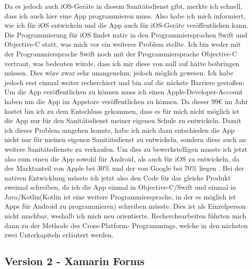     Da es jedoch auch iOS-Geräte in diesem Sanitätsdienst gibt, merkte ich schnell, 
    dass ich auch hier eine App programmieren muss. Also habe ich mich informiert,
    wie ich für iOS entwickeln und die App auch für iOS-Geräte veröffentlichen kann.
    Die Programmierung für iOS findet nativ in den Programmiersprachen Swift und Objective-C
    statt, was mich vor ein weiteres Problem stellte. Ich bin weder mit der Programmiersprache
    Swift noch mit der Programmiersprache Objective-C vertraut, was bedeuten würde, dass ich mir
    diese von null auf hätte beibringen müssen. Dies wäre zwar sehr unangenehm, jedoch möglich gewesen.
    Ich habe jedoch erst einmal weiter recherchiert und bin auf die nächste Barriere gestoßen:
    Um die App veröffentlichen zu können muss ich einen Apple-Developer-Account haben um die App
    im Appstore veröffentlichen zu können. Da dieser 99€ im Jahr kostet bin ich zu dem Entschluss 
    gekommen, dass es für mich nicht möglich ist die App nur für den Sanitätsdienst meiner eigenen Schule
    zu entwickeln. Damit ich dieses Problem umgehen konnte, habe ich mich dazu entschieden die App nicht 
    nur für meinen eigenen Sanitätsdienst zu entwickeln, sondern diese auch an weitere Sanitätsdienste
    zu verkaufen. Um dies zu bewerkstelligen musste ich jetzt also zum einen die App sowohl für
    Android, als auch für iOS zu entwickeln, da der Marktanteil von Apple bei 30\% und der von Google bei
    70\% liegen \cite[vgl.]{Marktanteil}. Bei der nativen Entwicklung müsste ich jetzt also 
    den Code für das \glqq gleiche\grqq{} Produkt zweimal schreiben, da ich die App einmal in
    Objective-C/Swift und einmal in Java/Kotlin(Kotlin ist eine weitere Programmiersprache, in der 
    es möglich ist Apps für Android zu programmieren) schreiben müsste.
    Dies ist als Einzelperson nicht machbar, weshalb ich mich neu orientierte. 
    Recherchearbeiten führten mich dann zu der Methode des Cross-Platform-
    Programmings, welche in den nächsten zwei Unterkapiteln erläutert werden.

\subsection{Version 2 - Xamarin Forms}


